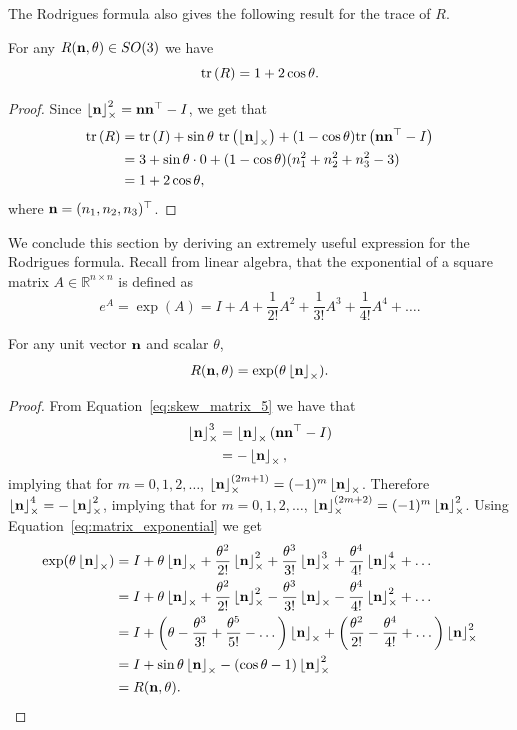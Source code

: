 The Rodrigues formula also gives the following result for the trace of $R$.
\begin{lemma}\label{lem:prelim-trace-of-R}
For any $R(\mathbf{n},\theta)\in SO(3)$ we have
\[
\text{tr}\left(R\right) = 1+2\cos\theta.
\]	
\end{lemma}
\begin{proof}
Since $\left\lfloor\mathbf{n}\right\rfloor_{\times}^2 = \mathbf{n} \mathbf{n}^\top  - I$, we get that
\begin{align*}
\text{tr}\left(R\right) &= \text{tr}\left(I\right) + \sin\theta~\text{tr}\left(\left\lfloor\mathbf{n}\right\rfloor_{\times}\right) + (1-\cos\theta)\text{tr}\left(\mathbf{n} \mathbf{n}^\top - I\right) \\
          &= 3 + \sin\theta \cdot 0 + (1-\cos\theta)(n_1^2+n_2^2+n_3^2 - 3) \\
          &= 1 + 2\cos\theta,
\end{align*}
where $\mathbf{n}=(n_1, n_2, n_3)^\top$.
\end{proof}

We conclude this section by deriving an extremely useful expression for the Rodrigues formula.  Recall from linear algebra, that the exponential of a square matrix $A\in\mathbb{R}^{n\times n}$ is defined as
\begin{equation}\label{eq:matrix_exponential}
e^{A} = \exp(A) = I + A + \frac{1}{2!}A^2 + \frac{1}{3!}A^3 + \frac{1}{4!}A^4 + \dots.
\end{equation}
\begin{lemma}\label{lem:rodrigues_exponential}
For any unit vector $\mathbf{n}$ and scalar $\theta$,
\[
R(\mathbf{n},\theta) = \exp(\theta\left\lfloor\mathbf{n}\right\rfloor_{\times}).
\]	
\end{lemma}
\begin{proof}
From Equation~\eqref{eq:skew_matrix_5} we have that
\begin{align*}
	\left\lfloor\mathbf{n}\right\rfloor_{\times}^3 &= \left\lfloor\mathbf{n}\right\rfloor_{\times}(\mathbf{n}\mathbf{n}^\top-I) \\
	            &= -\left\lfloor\mathbf{n}\right\rfloor_{\times},
\end{align*}
implying that for $m=0, 1, 2, \dots$, $\left\lfloor\mathbf{n}\right\rfloor_{\times}^{(2m+1)} = (-1)^m\left\lfloor\mathbf{n}\right\rfloor_{\times}$.
Therefore $\left\lfloor\mathbf{n}\right\rfloor_{\times}^4=-\left\lfloor\mathbf{n}\right\rfloor_{\times}^2$, implying that for $m=0, 1, 2, \dots$, 
$\left\lfloor\mathbf{n}\right\rfloor_{\times}^{(2m+2)} = (-1)^m\left\lfloor\mathbf{n}\right\rfloor_{\times}^2$. Using Equation~\eqref{eq:matrix_exponential} we get
\begin{align*}
\exp(\theta \left\lfloor\mathbf{n}\right\rfloor_{\times}) &= I + \theta \left\lfloor\mathbf{n}\right\rfloor_{\times} + \frac{\theta^2}{2!}\left\lfloor\mathbf{n}\right\rfloor_{\times}^2 + \frac{\theta^3}{3!}\left\lfloor\mathbf{n}\right\rfloor_{\times}^3 + \frac{\theta^4}{4!}\left\lfloor\mathbf{n}\right\rfloor_{\times}^4
                          + \dots \\
                      &= I + \theta \left\lfloor\mathbf{n}\right\rfloor_{\times} + \frac{\theta^2}{2!}\left\lfloor\mathbf{n}\right\rfloor_{\times}^2 - \frac{\theta^3}{3!} \left\lfloor\mathbf{n}\right\rfloor_{\times} - \frac{\theta^4}{4!}\left\lfloor\mathbf{n}\right\rfloor_{\times}^2 +\dots \\
                      &= I + \left(\theta - \frac{\theta^3}{3!} + \frac{\theta^5}{5!} - \dots \right)\left\lfloor\mathbf{n}\right\rfloor_{\times} + \left(\frac{\theta^2}{2!} - \frac{\theta^4}{4!} + \dots\right)\left\lfloor\mathbf{n}\right\rfloor_{\times}^2 \\
                      &= I + \sin\theta\left\lfloor\mathbf{n}\right\rfloor_{\times} -(\cos\theta -1)\left\lfloor\mathbf{n}\right\rfloor_{\times}^2 \\
                      &= R(\mathbf{n}, \theta).
\end{align*}
\end{proof}

